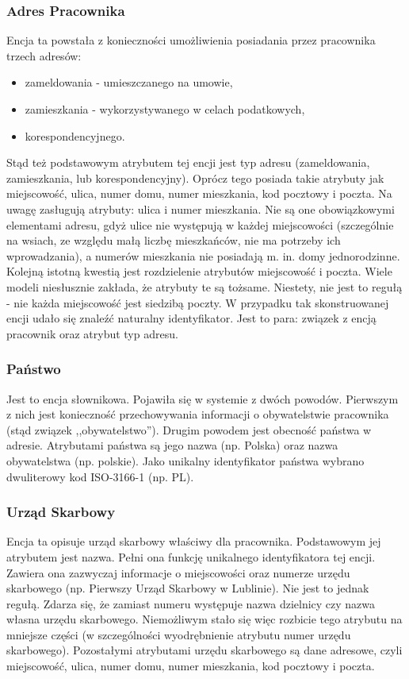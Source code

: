 \subsubsection{Adres Pracownika}
Encja ta powstała z konieczności umożliwienia posiadania przez pracownika trzech adresów: 
\begin{itemize}
	\item zameldowania - umieszczanego na umowie,
	\item zamieszkania - wykorzystywanego w celach podatkowych,
	\item korespondencyjnego.
\end{itemize}
Stąd też podstawowym atrybutem tej encji jest typ adresu (zameldowania, zamieszkania, lub korespondencyjny). Oprócz tego posiada takie atrybuty jak miejscowość, ulica, numer domu, numer mieszkania, kod pocztowy i poczta. Na uwagę zasługują atrybuty: ulica i numer mieszkania. Nie są one obowiązkowymi elementami adresu, gdyż ulice nie występują w każdej miejscowości (szczególnie na wsiach, ze względu małą liczbę mieszkańców, nie ma potrzeby ich wprowadzania), a numerów mieszkania nie posiadają m. in. domy jednorodzinne. Kolejną istotną kwestią jest rozdzielenie atrybutów miejscowość i poczta. Wiele modeli niesłusznie zakłada, że atrybuty te są tożsame. Niestety, nie jest to regułą - nie każda miejscowość jest siedzibą poczty.
W przypadku tak skonstruowanej encji udało się znaleźć naturalny identyfikator. Jest to para: związek z encją pracownik oraz atrybut typ adresu.

\subsubsection{Państwo}
Jest to encja słownikowa. Pojawiła się w systemie z dwóch powodów. Pierwszym z nich jest konieczność przechowywania informacji o obywatelstwie pracownika  (stąd związek ,,obywatelstwo''). Drugim powodem jest obecność państwa w adresie. Atrybutami państwa są jego nazwa (np. Polska) oraz nazwa obywatelstwa (np. polskie). Jako unikalny identyfikator państwa wybrano dwuliterowy kod ISO-3166-1\cite{panstwa} (np. PL).

\subsubsection{Urząd Skarbowy}
Encja ta opisuje urząd skarbowy właściwy dla pracownika. Podstawowym jej atrybutem jest nazwa. Pełni ona funkcję unikalnego identyfikatora tej encji. Zawiera ona zazwyczaj informacje o miejscowości oraz numerze urzędu skarbowego (np. Pierwszy Urząd Skarbowy w Lublinie). Nie jest to jednak regułą. Zdarza się, że zamiast numeru występuje nazwa dzielnicy czy nazwa własna urzędu skarbowego. Niemożliwym stało się więc rozbicie tego atrybutu na mniejsze części (w szczególności wyodrębnienie atrybutu numer urzędu skarbowego). Pozostałymi atrybutami urzędu skarbowego są dane adresowe, czyli miejscowość, ulica, numer domu, numer mieszkania, kod pocztowy i poczta.

